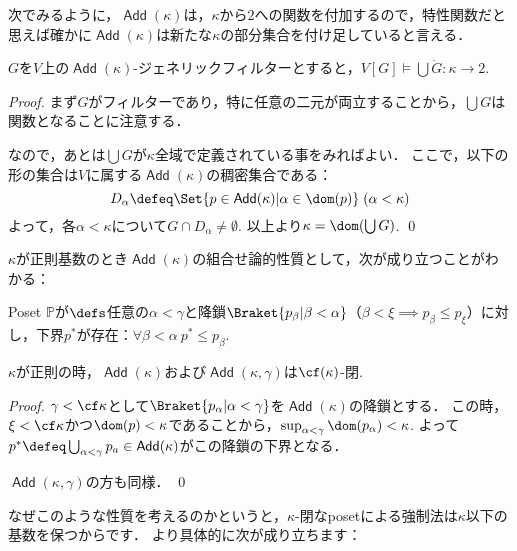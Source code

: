 \documentclass[a4j]{ltjsarticle}
\renewcommand{\emph}[1]{\textbf{\textgt{#1}}}
\renewcommand{\Add}{\mathop{\mathsf{Add}}}
\begin{document}
次でみるように，$\Add(\kappa)$は，$\kappa$から$2$への関数を付加するので，特性関数だと思えば確かに$\Add(\kappa)$は新たな$\kappa$の部分集合を付け足していると言える．
\begin{lemma}
 $G$を$V$上の$\Add(\kappa)$-ジェネリックフィルターとすると，$V[G] \models \bigcup\dot{G}: \kappa \to 2$.
\end{lemma}
\begin{proof}
 まず$G$がフィルターであり，特に任意の二元が両立することから，$\bigcup G$は関数となることに注意する．

 なので，あとは$\bigcup G$が$\kappa$全域で定義されている事をみればよい．
 ここで，以下の形の集合は$V$に属する$\Add(\kappa)$の稠密集合である：
 \[
  D_\alpha \defeq \Set{p \in \Add(\kappa) | \alpha \in \dom(p)}\;(\alpha < \kappa)
 \]
 よって，各$\alpha < \kappa$について$G \cap D_\alpha \neq \emptyset$.
 以上より$\kappa = \dom(\bigcup G)$. \qed
\end{proof}

$\kappa$が正則基数のとき$\Add(\kappa)$の組合せ論的性質として，次が成り立つことがわかる：

\begin{definition}
 Poset $\mathbb{P}$が\emph{$\gamma$-閉}$\defs$任意の$\alpha < \gamma$と降鎖$\Braket{p_\beta | \beta < \alpha}$（$\beta < \xi \implies p_\beta \leq p_\xi$）に対し，下界$p^*$が存在：$\forall \beta < \alpha\: p^* \leq p_\beta$.
\end{definition}

\begin{lemma}
 $\kappa$が正則の時，$\Add(\kappa)$および$\Add(\kappa, \gamma)$は$\cf(\kappa)$-閉.
\end{lemma}
\begin{proof}
 $\gamma < \cf \kappa$として$\Braket{p_\alpha | \alpha < \gamma}$を$\Add(\kappa)$の降鎖とする．
 この時，$\xi < \cf \kappa$かつ$\dom(p) < \kappa$であることから，$\sup_{\alpha < \gamma} \dom(p_\alpha) < \kappa$.
 よって$p^* \defeq \bigcup_{\alpha < \gamma} p_a \in \Add(\kappa)$がこの降鎖の下界となる．

 $\Add(\kappa, \gamma)$の方も同様． \qed
\end{proof}

なぜこのような性質を考えるのかというと，$\kappa$-閉なposetによる強制法は$\kappa$以下の基数を保つからです．
より具体的に次が成り立ちます：
\end{document}
